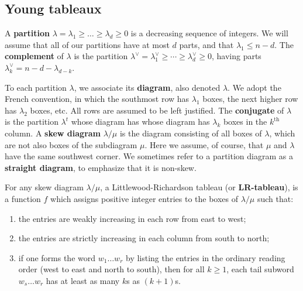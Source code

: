 \subsection{Young tableaux}
\label{sec:tableaux}
A {\bf partition} $\lambda = \lambda_1 \geq \dots \geq \lambda_d \geq 0$ is a
decreasing sequence of integers.  We will assume that all of our partitions
have at most $d$ parts, and that $\lambda_1 \leq n-d$.
The {\bf complement} of $\lambda$ is the partition 
$\lambda^\vee = \lambda^\vee_1 \geq \cdots \geq \lambda^\vee_d \geq 0$, having
parts $\lambda^\vee_k = n-d -\lambda_{d-k}$.

To each partition $\lambda$, we associate
its {\bf diagram}, also denoted $\lambda$.  We adopt the French convention, 
in which the southmost row has $\lambda_1$ boxes, the next higher row 
has $\lambda_2$ boxes, etc.  All rows are assumed to be left justified.  
The {\bf conjugate} of $\lambda$ is the partition $\lambda^t$ whose
diagram has whose diagram has $\lambda_k$ boxes in the $k^\text{th}$ 
column.  A {\bf skew diagram} $\lambda/\mu$ is the diagram consisting of all 
boxes of $\lambda$, which are not also boxes of the subdiagram
$\mu$.  Here we assume,
of course, that $\mu$ and $\lambda$ have the same southwest corner.
We sometimes refer to a partition diagram as a {\bf straight diagram}, 
to emphasize that it is non-skew.


For any skew diagram $\lambda/\mu$, a Littlewood-Richardson tableau 
(or {\bf LR-tableau}),
is a function $f$ which assigns positive integer entries to the boxes 
of $\lambda/\mu$ such that:
\begin{enumerate} 
\item[(i)] the entries are weakly increasing in each row from east to west;
\item[(ii)] 
the entries are strictly increasing in each column from south to north;
\item[(iii)] 
if one forms the word $w_1\ldots w_r$ by listing the entries in
the ordinary reading order (west to east and north to south), then
for all $k \geq 1$, each tail subword $w_s\ldots w_r$ has at least as 
many $k$s as $(k{+}1)$s.
\end{enumerate}

